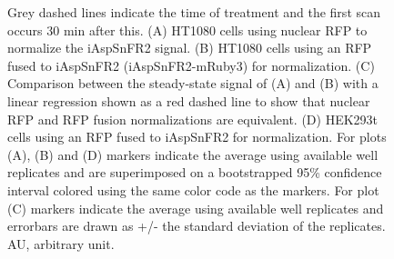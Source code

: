\documentclass[9pt,lineno]{elife}
\begin{document}
\begin{figure}[ht!]
{Grey dashed lines indicate the time of treatment and the first scan occurs 30 min after this.
(A) HT1080 cells using nuclear RFP to normalize the iAspSnFR2 signal.
(B) HT1080 cells using an RFP fused to iAspSnFR2 (iAspSnFR2-mRuby3) for normalization.
(C) Comparison between the steady-state signal of (A) and (B) with a linear regression shown as a red dashed line to show that nuclear RFP and RFP fusion normalizations are equivalent.
(D) HEK293t cells using an RFP fused to iAspSnFR2 for normalization.
For plots (A), (B) and (D) markers indicate the average using available well replicates and are superimposed on a bootstrapped 95\% confidence interval colored using the same color code as the markers.
For plot (C) markers indicate the average using available well replicates and errorbars are drawn as +/- the standard deviation of the replicates.
AU, arbitrary unit.
}{}\label{figsupp:f2S1}
\label{figsupp:f2S2}
\end{figure}
\end{document}
